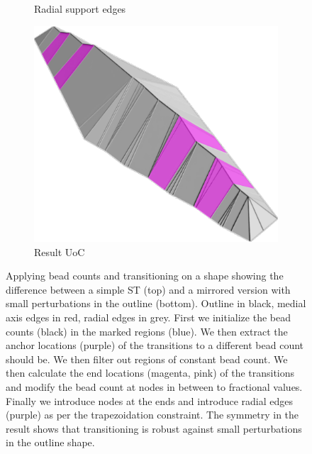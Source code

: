 \begin{figure}
\begin{subfigure}{\figwidth}
\caption{Radial support edges}\label{beading_transitioning_filtering__transitions_applied}
\end{subfigure}
\begin{subfigure}{.27\textwidth}
\hspace*{-.5cm}\includegraphics[width=1.2\columnwidth]{sources/method/beading_transitioning_filtering__result_uoc.pdf}
\caption{Result UoC}\label{beading_transitioning_filtering__result_uoc}
\end{subfigure}
\caption{
Applying bead counts and transitioning on a shape showing the difference between a simple ST (top) and a mirrored version with small perturbations in the outline (bottom).
Outline in black, medial axis edges in red, radial edges in grey.
 First we initialize the bead counts (black) in the marked regions (blue).
 We then extract the anchor locations (purple) of the transitions to a different bead count should be.
 We then filter out regions of constant bead count.
 We then calculate the end locations (magenta, pink) of the transitions and modify the bead count at nodes in between to fractional values.
 Finally we introduce nodes at the ends and introduce radial edges (purple) as per the trapezoidation constraint.
The symmetry in the result shows that transitioning is robust against small perturbations in the outline shape.
}
\label{beading_transitioning_filtering}
\end{figure}


